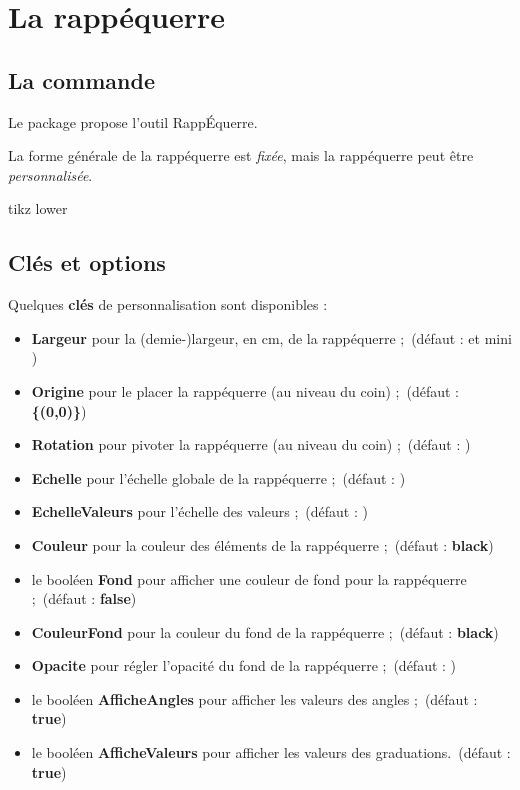 \documentclass[french,a4paper,11pt]{article}
\newcommand\Cle[1]{{\bfseries\sffamily\textlangle #1\textrangle}}
\begin{document}
\pagebreak

\section{La \og rappéquerre \fg}

\subsection{La commande}

\begin{cautionblock}
Le package propose l'outil \textsf{RappÉquerre}.

La forme générale de la rappéquerre est \textit{fixée}, mais la rappéquerre peut être \textit{personnalisée}.
\end{cautionblock}

\begin{PresentationCode}{tikz lower}
\tkzRappEquerre
\end{PresentationCode}

\subsection{Clés et options}

\begin{tipblock}
Quelques \Cle{clés} de personnalisation sont disponibles :

\begin{itemize}
	\item \Cle{Largeur} pour la (demie-)largeur, en cm, de la rappéquerre ;\hfill~(défaut : \Cle{6} et mini \Cle{3})
	\item \Cle{Origine} pour le placer la rappéquerre (au niveau du coin) ;\hfill~(défaut : \Cle{\{(0,0)\}})
	\item \Cle{Rotation} pour pivoter la rappéquerre (au niveau du coin) ;\hfill~(défaut : \Cle{0})
	\item \Cle{Echelle} pour l'échelle globale de la rappéquerre ;\hfill~(défaut : \Cle{1})
	\item \Cle{EchelleValeurs} pour l'échelle des valeurs ;\hfill~(défaut : \Cle{1})
	\item \Cle{Couleur} pour la couleur des éléments de la rappéquerre ;\hfill~(défaut : \Cle{black})
	\item le booléen \Cle{Fond} pour afficher une couleur de fond pour la rappéquerre ;\hfill~(défaut : \Cle{false})
	\item \Cle{CouleurFond} pour la couleur du fond de la rappéquerre ;\hfill~(défaut : \Cle{black})
	\item \Cle{Opacite} pour régler l'opacité du fond de la rappéquerre ;\hfill~(défaut : \Cle{0.5})
	\item le booléen \Cle{AfficheAngles} pour afficher les valeurs des angles ;\hfill~(défaut : \Cle{true})
	\item le booléen \Cle{AfficheValeurs} pour afficher les valeurs des graduations.\hfill~(défaut : \Cle{true})
\end{itemize}
\vspace*{-\baselineskip}\leavevmode
\end{tipblock}
\end{document}
